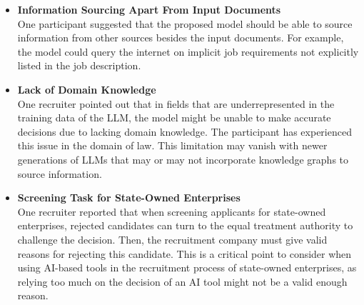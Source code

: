 \documentclass[draft,final]{thesisclass} %
\begin{document}
\begin{enumerate}
\begin{itemize}
        \item \textbf{Information Sourcing Apart From Input Documents}\\
        One participant suggested that the proposed model should be able to source information from other sources besides the input documents.
        For example, the model could query the internet on implicit job requirements not explicitly listed in the job description.
        \item \textbf{Lack of Domain Knowledge}\\
        One recruiter pointed out that in fields that are underrepresented in the training data of the \gls{LLM}, the model might be unable to make accurate decisions due to lacking domain knowledge. The participant has experienced this issue in the domain of law. This limitation may vanish with newer generations of \gls{LLM}s that may or may not incorporate knowledge graphs to source information.
        \item \textbf{Screening Task for State-Owned Enterprises}\\
        One recruiter reported that when screening applicants for state-owned enterprises, rejected candidates can turn to the equal treatment authority to challenge the decision. Then, the recruitment company must give valid reasons for rejecting this candidate. This is a critical point to consider when using \acs{AI}-based tools in the recruitment process of state-owned enterprises, as relying too much on the decision of an \acs{AI} tool might not be a valid enough reason.
    \end{itemize}
\end{enumerate}
\end{document}
